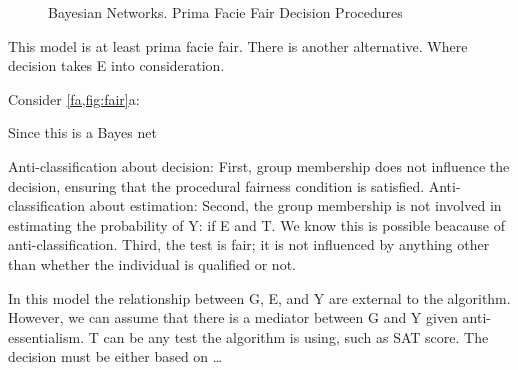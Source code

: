 \documentclass{article}
\begin{document}
    
  \begin{figure}[h]
 \caption{Bayesian Networks. Prima Facie Fair Decision Procedures}
  \label{fig:fair}
\end{figure}


This model is at least prima facie fair. There is another alternative. Where decision takes E into consideration. 


Consider \ref{fa,fig:fair}a: 

Since this is a Bayes net 







Anti-classification about decision: 
First, group membership does not influence the decision, ensuring that the procedural fairness condition is satisfied.
Anti-classification about estimation: 
Second, the group membership is not involved in estimating the probability of Y: if E and T. We know this is possible beacause of anti-classification. 
Third, the test is fair; it is not influenced by anything other than whether the individual is qualified or not. 

In this model the relationship between G, E, and Y are external to the algorithm. However, we can assume that there is a mediator between G and Y given anti-essentialism. T can be any test the algorithm is using, such as SAT score. The decision must be either based on \dots
\end{document}
